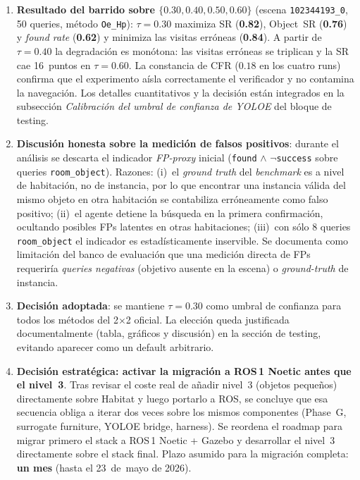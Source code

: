 \documentclass[11pt,a4paper]{article}
\begin{document}
\begin{enumerate}
  \item \textbf{Resultado del barrido sobre $\{0.30, 0.40, 0.50, 0.60\}$}
        (escena \texttt{102344193\_0}, 50 queries, método \texttt{Oe\_Hp}):
        $\tau=0.30$ maximiza SR (\textbf{0.82}), Object~SR (\textbf{0.76}) y
        \emph{found rate} (\textbf{0.62}) y minimiza las visitas erróneas
        (\textbf{0.84}). A partir de $\tau=0.40$ la degradación es monótona:
        las visitas erróneas se triplican y la SR cae 16~puntos en $\tau=0.60$.
        La constancia de CFR ($0.18$ en los cuatro runs) confirma que el
        experimento aísla correctamente el verificador y no contamina la
        navegación. Los detalles cuantitativos y la decisión están integrados
        en la subsección \emph{Calibración del umbral de confianza de YOLOE}
        del bloque de testing.

  \item \textbf{Discusión honesta sobre la medición de falsos positivos}:
        durante el análisis se descarta el indicador \emph{FP-proxy} inicial
        (\texttt{found} $\land$ $\neg$\texttt{success} sobre queries
        \texttt{room\_object}). Razones: (i)~el \emph{ground truth} del
        \emph{benchmark} es a nivel de habitación, no de instancia, por lo que
        encontrar una instancia válida del mismo objeto en otra habitación se
        contabiliza erróneamente como falso positivo; (ii)~el agente detiene la
        búsqueda en la primera confirmación, ocultando posibles FPs latentes en
        otras habitaciones; (iii)~con sólo 8 queries \texttt{room\_object} el
        indicador es estadísticamente inservible. Se documenta como limitación
        del banco de evaluación que una medición directa de FPs requeriría
        \emph{queries negativas} (objetivo ausente en la escena) o
        \emph{ground-truth} de instancia.

  \item \textbf{Decisión adoptada}: se mantiene $\tau=0.30$ como umbral de
        confianza para todos los métodos del 2$\times$2 oficial. La elección
        queda justificada documentalmente (tabla, gráficos y discusión) en la
        sección de testing, evitando aparecer como un default arbitrario.

  \item \textbf{Decisión estratégica: activar la migración a ROS\,1 Noetic
        antes que el nivel~3}. Tras revisar el coste real de añadir nivel~3
        (objetos pequeños) directamente sobre Habitat y luego portarlo a ROS,
        se concluye que esa secuencia obliga a iterar dos veces sobre los
        mismos componentes (Phase~G, surrogate furniture, YOLOE bridge,
        harness). Se reordena el roadmap para migrar primero el stack a
        ROS\,1 Noetic + Gazebo y desarrollar el nivel~3 directamente sobre el
        stack final. Plazo asumido para la migración completa: \textbf{un mes}
        (hasta el 23~de~mayo de 2026).


\end{enumerate}
\end{document}

